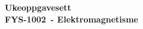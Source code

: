 \begin{center}
    {\huge{\textbf{Ukeoppgavesett \setName\\ FYS-1002\ - Elektromagnetisme\\}}}{}
\end{center}

